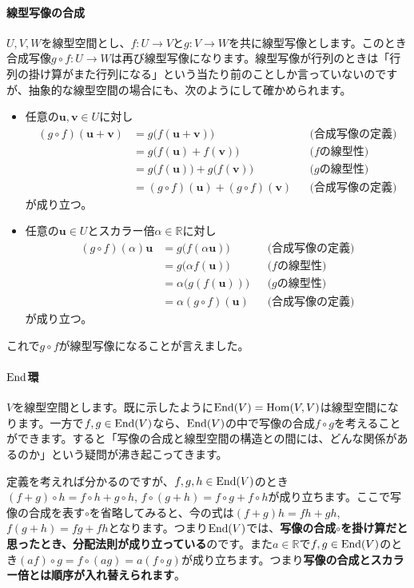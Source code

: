 \paragraph{線型写像の合成}
$U, V, W$を線型空間とし、$f\colon U\rightarrow V$と$g\colon V\rightarrow W$を共に線型写像とします。このとき合成写像$g\circ f\colon U\rightarrow W$は再び線型写像になります。線型写像が行列のときは「行列の掛け算がまた行列になる」という当たり前のことしか言っていないのですが、抽象的な線型空間の場合にも、次のようにして確かめられます。
\begin{itemize}
\item 任意の$\bm{u}, \bm{v}\in U$に対し
\begin{align*}
(g\circ f)(\bm{u} + \bm{v}) &= g\bigl(f(\bm{u} + \bm{v})\bigr) & & \text{(合成写像の定義)} \\
&= g\bigl(f(\bm{u}) + f(\bm{v})\bigr) & & \text{($f$の線型性)} \\
&= g\bigl(f(\bm{u})\bigr) + g\bigl(f(\bm{v})\bigr) & & \text{($g$の線型性)} \\
&= (g\circ f)(\bm{u}) + (g\circ f)(\bm{v}) & & \text{(合成写像の定義)}
\end{align*}
が成り立つ。
\item 任意の$\bm{u}\in U$とスカラー倍$\alpha \in\mathbb{R}$に対し
\begin{align*}
(g\circ f)(\alpha) \bm{u} &= g\bigl(f(\alpha\bm{u})\bigr) & & \text{(合成写像の定義)} \\
&= g\bigl(\alpha f(\bm{u})\bigr) & & \text{($f$の線型性)} \\
&= \alpha \bigl(g(f(\bm{u}))\bigr) & & \text{($g$の線型性)} \\
&= \alpha (g\circ f)(\bm{u}) & & \text{(合成写像の定義)}
\end{align*}
が成り立つ。
\end{itemize}
これで$g\circ f$が線型写像になることが言えました。

\paragraph{$\operatorname{End}$環}

$V$を線型空間とします。既に示したように$\operatorname{End}(V) = \operatorname{Hom}(V, V)$は線型空間になります。一方で$f, g\in\operatorname{End}(V)$なら、$\operatorname{End}(V)$の中で写像の合成$f \circ g$を考えることができます。すると「写像の合成と線型空間の構造との間には、どんな関係があるのか」という疑問が沸き起こってきます。

定義を考えれば分かるのですが、$f, g, h\in\operatorname{End}(V)$のとき$(f + g) \circ h = f\circ h + g \circ h$, $f \circ (g + h) = f \circ g + f \circ h$が成り立ちます。ここで写像の合成を表す$\circ$を省略してみると、今の式は$(f + g)h = fh + gh$, $f(g + h) = fg + fh$となります。つまり$\operatorname{End}(V)$では、\textbf{写像の合成$\circ$を掛け算だと思ったとき、分配法則が成り立っている}のです。また$a\in\mathbb{R}$で$f, g\in\operatorname{End}(V)$のとき$(af)\circ g = f \circ (ag) = a(f\circ g)$が成り立ちます。つまり\textbf{写像の合成とスカラー倍とは順序が入れ替えられます}。

